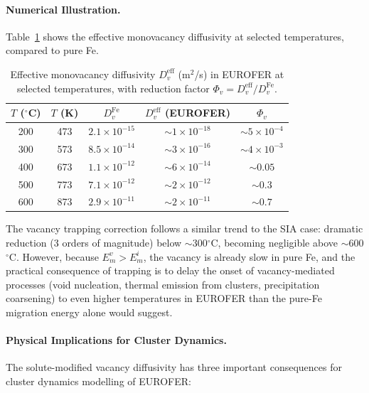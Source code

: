 \documentclass[pdflatex,sn-basic]{sn-jnl} %
\begin{document}
\paragraph{Numerical Illustration.}

Table~\ref{tab:Dv_numerical} shows the effective monovacancy diffusivity at
selected temperatures, compared to pure Fe.

\begin{table}[htbp]
\centering
\caption{Effective monovacancy diffusivity $D_v^{\mathrm{eff}}$ (m$^2$/s) in
EUROFER at selected temperatures, with reduction factor
$\Phi_v = D_v^{\mathrm{eff}}/D_v^{\mathrm{Fe}}$.}
\label{tab:Dv_numerical}
\begin{tabular}{ccccc}
\toprule
$T$ ($^\circ$C) & $T$ (K) & $D_v^{\mathrm{Fe}}$ & $D_v^{\mathrm{eff}}$ (EUROFER) & $\Phi_v$ \\
\midrule
200 & 473 & $2.1\times10^{-15}$ & $\sim 1\times10^{-18}$ & $\sim 5\times10^{-4}$ \\
300 & 573 & $8.5\times10^{-14}$ & $\sim 3\times10^{-16}$ & $\sim 4\times10^{-3}$ \\
400 & 673 & $1.1\times10^{-12}$ & $\sim 6\times10^{-14}$ & $\sim 0.05$ \\
500 & 773 & $7.1\times10^{-12}$ & $\sim 2\times10^{-12}$ & $\sim 0.3$ \\
600 & 873 & $2.9\times10^{-11}$ & $\sim 2\times10^{-11}$ & $\sim 0.7$ \\
\bottomrule
\end{tabular}
\end{table}

The vacancy trapping correction follows a similar trend to the SIA case:
dramatic reduction (3 orders of magnitude) below $\sim$300$^\circ$C, becoming
negligible above $\sim$600$^\circ$C. However, because $E_m^v > E_m^i$, the
vacancy is already slow in pure Fe, and the practical consequence of trapping
is to delay the onset of vacancy-mediated processes (void nucleation, thermal
emission from clusters, precipitation coarsening) to even higher temperatures
in EUROFER than the pure-Fe migration energy alone would suggest.

\paragraph{Physical Implications for Cluster Dynamics.}

The solute-modified vacancy diffusivity has three important consequences for
cluster dynamics modelling of EUROFER:
\end{document}
